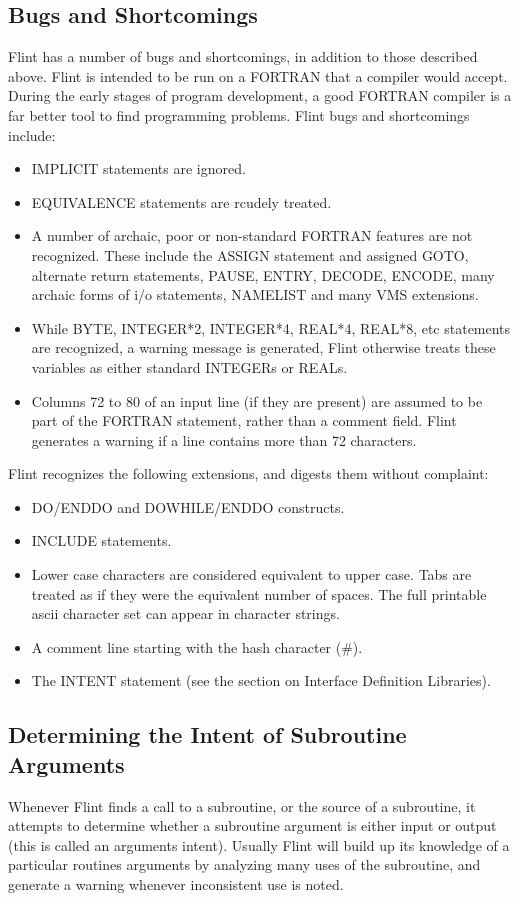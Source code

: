 \documentclass{report}
\begin{document}
\subsection{Bugs and Shortcomings}
Flint has a number of bugs and shortcomings, in addition to those described
above. Flint is intended to be run on a FORTRAN that a compiler would
accept. During the early stages of program development, a good FORTRAN compiler
is a far better tool to find programming problems. Flint bugs and
shortcomings include:
\begin{itemize}
\item IMPLICIT statements are ignored.
\item EQUIVALENCE statements are rcudely treated.
\item A number of archaic, poor or non-standard FORTRAN features are not
recognized. These include the ASSIGN statement and assigned GOTO, alternate
return statements, PAUSE, ENTRY, DECODE, ENCODE, many
archaic forms of i/o statements, NAMELIST and many VMS extensions.
\item While BYTE, INTEGER*2, INTEGER*4, REAL*4, REAL*8, etc statements are
recognized, a warning message is generated, Flint otherwise treats these
variables as either standard INTEGERs or REALs.
\item Columns 72 to 80 of an input line (if they are present) are assumed
to be part of the FORTRAN statement, rather than a comment field. Flint
generates a warning if a line contains more than 72 characters.
\end{itemize}
Flint recognizes the following extensions, and digests them without
complaint:
\begin{itemize}
\item DO/ENDDO and DOWHILE/ENDDO constructs.
\item INCLUDE statements.
\item Lower case characters are considered equivalent to upper case. Tabs
are treated as if they were the equivalent number of spaces. The full
printable ascii character set can appear in character strings.
\item A comment line starting with the hash character (\#).
\item The INTENT statement (see the section on Interface Definition Libraries).
\end{itemize}

\subsection{Determining the Intent of Subroutine Arguments}
Whenever Flint finds a call to a subroutine, or the source of a subroutine,
it attempts to determine whether a subroutine argument is either input or
output (this is called an arguments intent). Usually Flint will build up its
knowledge of a particular routines arguments by analyzing many uses of the
subroutine, and generate a warning whenever inconsistent use is noted.
\end{document}
